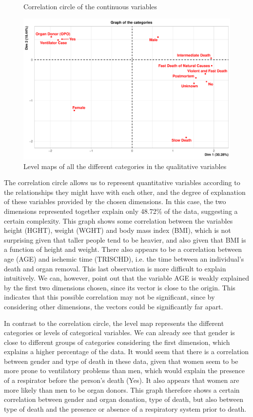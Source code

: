 \documentclass[a4paper, 11pt]{article}
\begin{document}
\begin{multicols}{2}
\begin{figure}[H]
	\caption{Correlation circle of the continuous variables}
	\label{fig:corCircle}
\end{figure}
\begin{figure}[H]
	\centering
	\includegraphics[width=\columnwidth]{figures/clinical_correlation_plots/all_categ_Dim}
	\caption{Level maps of all the different categories in the qualitative variables}
	\label{fig:lvlMap}
\end{figure}
The correlation circle allows us to represent quantitative variables according to the relationships they might have with each other, and the degree of explanation of these variables provided by the chosen dimensions. 
In this case, the two dimensions represented together explain only 48.72\% of the data, suggesting a certain complexity. 
This graph shows some correlation between the variables height (HGHT), weight (WGHT) and body mass index (BMI), which is not surprising given that taller people tend to be heavier, and also given that BMI is a function of height and weight. 
There also appears to be a correlation between age (AGE) and ischemic time (TRISCHD), i.e. the time between an individual's death and organ removal. 
This last observation is more difficult to explain intuitively. 
We can, however, point out that the variable AGE is weakly explained by the first two dimensions chosen, since its vector is close to the origin. 
This indicates that this possible correlation may not be significant, since by considering other dimensions, the vectors could be significantly far apart.

In contrast to the correlation circle, the level map represents the different categories or levels of categorical variables. 
We can already see that gender is close to different groups of categories considering the first dimension, which explains a higher percentage of the data. 
It would seem that there is a correlation between gender and type of death in these data, given that women seem to be more prone to ventilatory problems than men, which would explain the presence of a respirator before the person's death (Yes). 
It also appears that women are more likely than men to be organ donors. This graph therefore shows a certain correlation between gender and organ donation, type of death, but also between type of death and the presence or absence of a respiratory system prior to death.


\end{multicols}
\end{document}
